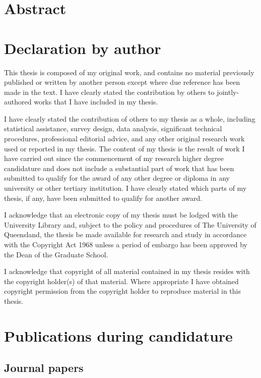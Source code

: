 \cleardoublepage

\section*{Abstract}

 

\clearpage
\section*{Declaration by author}

  This thesis is composed of my original work, and contains no material previously published or written by another person except where due reference has been made in the text. I have clearly stated the contribution by others to jointly-authored works that I have included in my thesis.

  I have clearly stated the contribution of others to my thesis as a whole, including statistical assistance, survey design, data analysis, significant technical procedures, professional editorial advice, and any other original research work used or reported in my thesis. The content of my thesis is the result of work I have carried out since the commencement of my research higher degree candidature and does not include a substantial part of work that has been submitted to qualify for the award of any other degree or diploma in any university or other tertiary institution. I have clearly stated which parts of my thesis, if any, have been submitted to qualify for another award.

  I acknowledge that an electronic copy of my thesis must be lodged with the University Library and, subject to the policy and procedures of The University of Queensland, the thesis be made available for research and study in accordance with the Copyright Act 1968 unless a period of embargo has been approved by the Dean of the Graduate School.

  I acknowledge that copyright of all material contained in my thesis resides with the copyright holder(s) of that material. Where appropriate I have obtained copyright permission from the copyright holder to reproduce material in this thesis.

\clearpage
\section*{Publications during candidature}

\subsection*{Journal papers}

